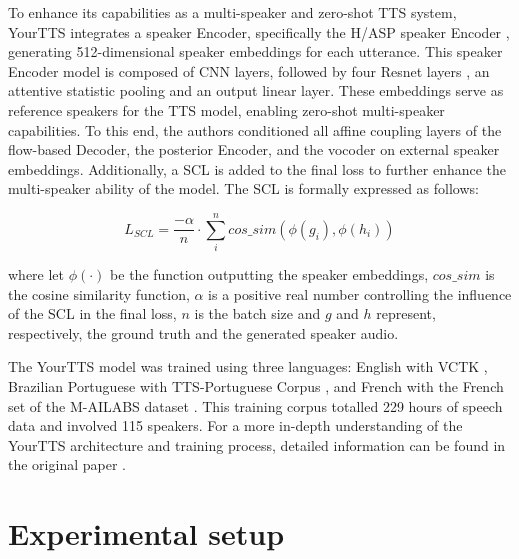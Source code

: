 To enhance its capabilities as a multi-speaker and zero-shot \ac{TTS} system, YourTTS integrates a speaker Encoder, specifically the \ac{H/ASP} speaker Encoder \cite{heo2020clova}, generating 512-dimensional speaker embeddings for each utterance. This speaker Encoder model is composed of \ac{CNN} layers, followed by four Resnet layers \cite{targ2016resnet}, an attentive statistic pooling and an output linear layer. These embeddings serve as reference speakers for the \ac{TTS} model, enabling zero-shot multi-speaker capabilities. To this end, the authors conditioned all affine coupling layers of the flow-based Decoder, the posterior Encoder, and the vocoder on external speaker embeddings. Additionally, a \ac{SCL} is added to the final loss to further enhance the multi-speaker ability of the model. The \ac{SCL} is formally expressed as follows:

\begin{equation}
    L_{SCL} = \frac{-\alpha}{n} \cdot \sum_{i}^{n} cos\_sim(\phi(g_i), \phi(h_i))
\end{equation}

where let $\phi(\cdot)$ be the function outputting the speaker embeddings, $cos\_sim$ is the cosine similarity function, $\alpha$ is a positive real number controlling the influence of the \ac{SCL} in the final loss, $n$ is the batch size and $g$ and $h$ represent, respectively, the ground truth and the generated speaker audio.

The YourTTS model was trained using three languages: English with VCTK \cite{veaux2016superseded}, Brazilian Portuguese with TTS-Portuguese Corpus \cite{casanova2022tts}, and French with the French set of the M-AILABS dataset \cite{mailabs}. This training corpus totalled 229 hours of speech data and involved 115 speakers. For a more in-depth understanding of the YourTTS architecture and training process, detailed information can be found in the original paper \cite{casanova2022yourtts}.


\section{Experimental setup}
\label{section:methods}


